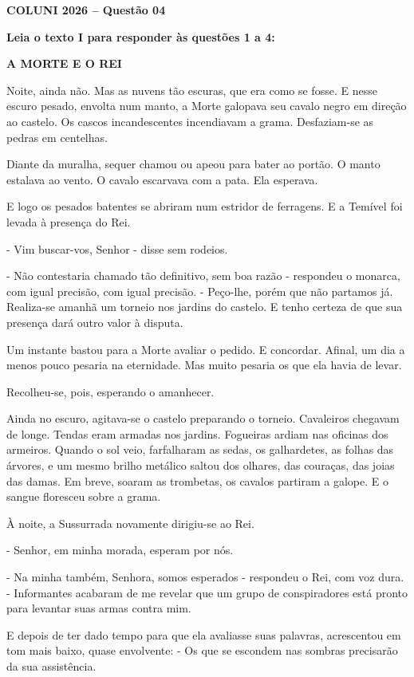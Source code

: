 \textbf{COLUNI 2026 -- Questão 04}\par\medskip \textbf{Leia o texto I para responder às questões 1 a 4:}

\begin{center}\textbf{A MORTE E O REI}\end{center}

Noite, ainda não. Mas as nuvens tão escuras, que era como se fosse. E nesse escuro pesado, envolta num manto, a Morte galopava seu cavalo negro em direção ao castelo. Os cascos incandescentes incendiavam a grama. Desfaziam-se as pedras em centelhas.

Diante da muralha, sequer chamou ou apeou para bater ao portão. O manto estalava ao vento. O cavalo escarvava com a pata. Ela esperava.

E logo os pesados batentes se abriram num estridor de ferragens. E a Temível foi levada à presença do Rei.

- Vim buscar-vos, Senhor - disse sem rodeios.

- Não contestaria chamado tão definitivo, sem boa razão - respondeu o monarca, com igual precisão, com igual precisão. - Peço-lhe, porém que não partamos já. Realiza-se amanhã um torneio nos jardins do castelo. E tenho certeza de que sua presença dará outro valor à disputa.

Um instante bastou para a Morte avaliar o pedido. E concordar. Afinal, um dia a menos pouco pesaria na eternidade. Mas muito pesaria os que ela havia de levar.

Recolheu-se, pois, esperando o amanhecer.

Ainda no escuro, agitava-se o castelo preparando o torneio. Cavaleiros chegavam de longe. Tendas eram armadas nos jardins. Fogueiras ardiam nas oficinas dos armeiros. Quando o sol veio, farfalharam as sedas, os galhardetes, as folhas das árvores, e um mesmo brilho metálico saltou dos olhares, das couraças, das joias das damas. Em breve, soaram as trombetas, os cavalos partiram a galope. E o sangue floresceu sobre a grama.

À noite, a Sussurrada novamente dirigiu-se ao Rei.

- Senhor, em minha morada, esperam por nós.

- Na minha também, Senhora, somos esperados - respondeu o Rei, com voz dura. - Informantes acabaram de me revelar que um grupo de conspiradores está pronto para levantar suas armas contra mim.

E depois de ter dado tempo para que ela avaliasse suas palavras, acrescentou em tom mais baixo, quase envolvente: - Os que se escondem nas sombras precisarão da sua assistência.

